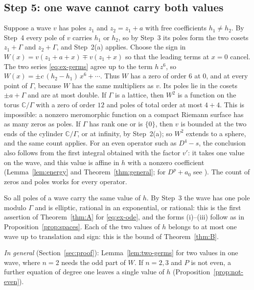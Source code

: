 \documentclass[11pt]{article}
\theoremstyle{definition}
\theoremstyle{remark}
\numberwithin{equation}{section}
\newcommand{\CC}{\mathbb C}
\begin{document}
\subsection{Step 5: one wave cannot carry both values}\label{sec:ex-two-values}

Suppose a wave \(v\) has poles \(z_1\) and \(z_2=z_1+a\) with free
coefficients \(h_1\ne h_2\). By Step~4 every pole of \(v\) carries
\(h_1\) or \(h_2\), so by Step~3 its poles form the two cosets
\(z_1+\Gamma\) and \(z_2+\Gamma\), and Step~2(a) applies. Choose the
sign in \(W(x)=v(z_1+a+x)\mp v(z_1+x)\) so that the leading terms at
\(x=0\) cancel. The two series \eqref{eq:ex-germs} agree up to the term
\(h\,z^6\), so \(W(x)=\pm c\,(h_2-h_1)\,x^6+\cdots\). Thus \(W\) has a
zero of order \(6\) at \(0\), and at every point of \(\Gamma\), because
\(W\) has the same multipliers as \(v\). Its poles lie in the cosets
\(\pm a+\Gamma\) and are at most double. If \(\Gamma\) is a lattice,
then \(W^2\) is a function on the torus \(\CC/\Gamma\) with a zero of
order \(12\) and poles of total order at most \(4+4\). This is
impossible: a nonzero meromorphic function on a compact Riemann surface
has as many zeros as poles. If \(\Gamma\) has rank one or is \(\{0\}\),
then \(v\) is bounded at the two ends of the cylinder \(\CC/\Gamma\),
or at infinity, by Step~2(a); so \(W^2\) extends to a sphere, and the
same count applies. For an even operator such as \(D^4-s\), the
conclusion also follows from the first integral obtained with the
factor \(v'\): it takes one value on the wave, and this value is affine
in \(h\) with a nonzero coefficient (Lemma~\ref{lem:energy} and
Theorem~\ref{thm:general}; for \(D^p+a_0\) see
\citet*[Lemma~4]{EremenkoLiaoNg2009}). The count of zeros and poles
works for every operator.

So all poles of a wave carry the same value of \(h\). By Step~3 the
wave has one pole modulo \(\Gamma\) and is elliptic, rational in an
exponential, or rational: this is the first assertion of
Theorem~\ref{thm:A} for \eqref{eq:ex-ode}, and the forms (i)--(iii)
follow as in Proposition~\ref{prop:spaces}. Each of the two values of \(h\) belongs to at most
one wave up to translation and sign: this is the bound of
Theorem~\ref{thm:B}.

\emph{In general} (Section~\ref{sec:proof}): Lemma~\ref{lem:two-germs}
for two values in one wave, where \(n=2\) needs the odd part of \(W\).
If \(n=2,3\) and \(P\) is not even, a further equation of degree one
leaves a single value of \(h\) (Proposition~\ref{prop:not-even}).
\end{document}
